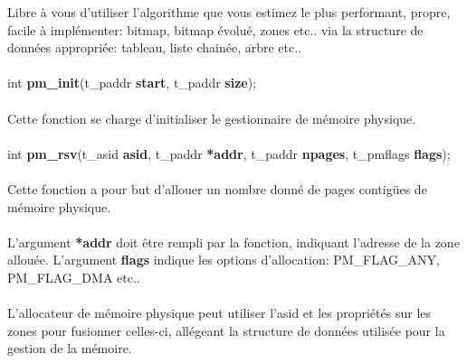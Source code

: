 \documentclass[10pt,a4wide]{article}
\begin{document}
Libre \`a vous d'utiliser l'algorithme que vous estimez le plus performant,
propre, facile \`a impl\'ementer: bitmap, bitmap \'evolu\'e, zones etc.. via
la structure de donn\'ees appropri\'ee: tableau, liste chain\'ee, arbre etc..

\paragraph{}

\hspace{1.5cm}int \textbf{pm\_init}(t\_paddr \textbf{start},
                                    t\_paddr \textbf{size});

\paragraph{}

Cette fonction se charge d'initialiser le gestionnaire de m\'emoire physique.

\paragraph{}

\hspace{1.5cm}int \textbf{pm\_rsv}(t\_asid \textbf{asid},
                                   t\_paddr \textbf{*addr},
                                   t\_paddr \textbf{npages},
                                   t\_pmflags \textbf{flags});

\paragraph{}

Cette fonction a pour but d'allouer un nombre donn\'e de pages contig\"ues
de m\'emoire physique.

\paragraph{}

L'argument \textbf{*addr} doit \^etre rempli par la fonction, indiquant
l'adresse de la zone allou\'ee. L'argument \textbf{flags} indique les options
d'allocation: PM\_FLAG\_ANY, PM\_FLAG\_DMA etc..

\paragraph{}

L'allocateur de m\'emoire physique peut utiliser l'asid et les
propri\'et\'es sur les zones pour fusionner celles-ci, all\'egeant
la structure de donn\'ees utilis\'ee pour la gestion de la m\'emoire.
\end{document}
